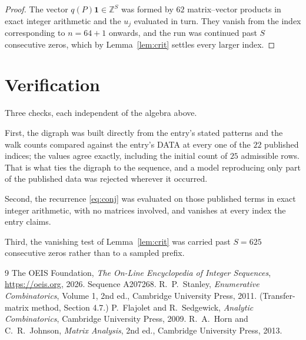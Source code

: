 \documentclass[11pt,a4paper]{article}
\theoremstyle{plain}
\theoremstyle{definition}
\begin{document}
\begin{proof}
The vector $q(P)\mathbf{1}\in\mathbb{Z}^{S}$ was formed by $62$ matrix--vector
products in exact integer arithmetic and the $u_j$ evaluated in turn. They vanish from the
index corresponding to $n=64+1$ onwards, and the run was continued past $S$ consecutive
zeros, which by Lemma~\ref{lem:crit} settles every larger index.
\end{proof}

\section{Verification}

Three checks, each independent of the algebra above.

First, the digraph was built directly from the entry's stated patterns and the walk counts
compared against the entry's DATA at every one of the $22$ published indices; the
values agree exactly, including the initial count of $25$ admissible rows. That is
what ties the digraph to the sequence, and a model reproducing only part of the published
data was rejected wherever it occurred.

Second, the recurrence \eqref{eq:conj} was evaluated on those published terms in exact
integer arithmetic, with no matrices involved, and vanishes at every index the entry claims.

Third, the vanishing test of Lemma~\ref{lem:crit} was carried past $S=625$ consecutive
zeros rather than to a sampled prefix.

\begin{thebibliography}{9}
 The OEIS Foundation, \emph{The On-Line Encyclopedia of Integer
Sequences}, \url{https://oeis.org}, 2026. Sequence A207268.
 R.~P.~Stanley, \emph{Enumerative Combinatorics}, Volume 1, 2nd ed.,
Cambridge University Press, 2011. (Transfer-matrix method, Section 4.7.)
 P.~Flajolet and R.~Sedgewick, \emph{Analytic Combinatorics}, Cambridge
University Press, 2009.
 R.~A.~Horn and C.~R.~Johnson, \emph{Matrix Analysis}, 2nd ed., Cambridge
University Press, 2013.
\end{thebibliography}
\end{document}
